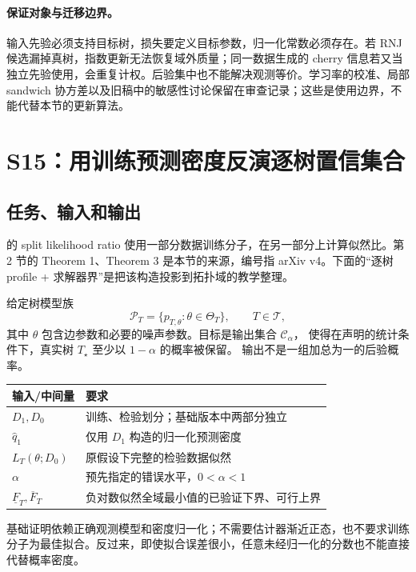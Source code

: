 \documentclass[UTF8,11pt,fontset=fandol,openany,oneside]{ctexbook}
\theoremstyle{definition}
\theoremstyle{remark}
\numberwithin{equation}{chapter}
\begin{document}
\paragraph{保证对象与迁移边界。}
输入先验必须支持目标树，损失要定义目标参数，归一化常数必须存在。若 RNJ 候选漏掉真树，指数更新无法恢复域外质量；同一数据生成的 cherry 信息若又当独立先验使用，会重复计权。后验集中也不能解决观测等价。学习率的校准、局部 sandwich 协方差以及旧稿中的敏感性讨论保留在审查记录；这些是使用边界，不能代替本节的更新算法。

\section{S15：用训练预测密度反演逐树置信集合}
\label{sec:textbook-S15}

\subsection{任务、输入和输出}

\citet{S15} 的 split likelihood ratio 使用一部分数据训练分子，在另一部分上计算似然比。第 2 节的 Theorem 1、Theorem 3 是本节的来源，编号指 arXiv v4。下面的“逐树 profile + 求解器界”是把该构造投影到拓扑域的教学整理。

给定树模型族
\[
 \mathcal P_T=\{p_{T,\theta}:\theta\in\Theta_T\},\qquad T\in\mathcal T,
\]
其中 $\theta$ 包含边参数和必要的噪声参数。目标是输出集合 $\mathcal C_\alpha$，
使得在声明的统计条件下，真实树 $T_\star$ 至少以 $1-\alpha$ 的概率被保留。
输出不是一组加总为一的后验概率。

\begin{center}
\begin{tabularx}{\linewidth}{lX}
\toprule
输入/中间量 & 要求\\
\midrule
$D_1,D_0$ & 训练、检验划分；基础版本中两部分独立\\
$\widehat q_1$ & 仅用 $D_1$ 构造的归一化预测密度\\
$L_T(\theta;D_0)$ & 原假设下完整的检验数据似然\\
$\alpha$ & 预先指定的错误水平，$0<\alpha<1$\\
$\underline F_T,\overline F_T$ & 负对数似然全域最小值的已验证下界、可行上界\\
\bottomrule
\end{tabularx}
\end{center}

基础证明依赖正确观测模型和密度归一化；不需要估计器渐近正态，也不要求训练分子为最佳拟合。反过来，即使拟合误差很小，任意未经归一化的分数也不能直接代替概率密度。
\end{document}
